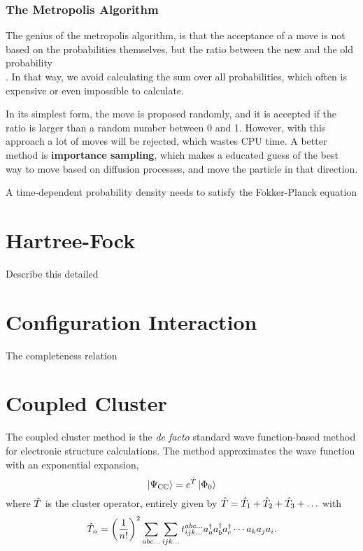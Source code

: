 \subsubsection{The Metropolis Algorithm}
The genius of the metropolis algorithm, is that the acceptance of a move is not based on the probabilities themselves, but the ratio between the new and the old probability\\
. In that way, we avoid calculating the sum over all probabilities, which often is expensive or even impossible to calculate. 

In its simplest form, the move is proposed randomly, and it is accepted if the ratio is larger than a random number between 0 and 1. However, with this approach a lot of moves will be rejected, which wastes CPU time. A better method is \textbf{importance sampling}, which makes a educated guess of the best way to move based on diffusion processes, and move the particle in that direction. 

A time-dependent probability density needs to satisfy the Fokker-Planck equation 


\section{Hartree-Fock} \label{sec:hf}
Describe this detailed


\section{Configuration Interaction} \label{subsec:ci}
The completeness relation

\section{Coupled Cluster} \label{subsec:cc}
The coupled cluster method is the \textit{de facto} standard wave function-based method for electronic structure calculations. \cite{paldus} The method approximates the wave function with an exponential expansion, 
\begin{equation}
\ket{\Psi_{\text{CC}}}=e^{\hat{T}}\ket{\Phi_0}
\end{equation}
where $\hat{T}$ is the cluster operator, entirely given by $\hat{T}=\hat{T}_1+\hat{T}_2 +\hat{T}_3+\hdots$ with
\begin{equation}
\hat{T}_n = \left( \frac{1}{n!}\right)^2 \sum_{abc...} \sum_{ijk...} t_{ijk...}^{abc...}a_a^\dagger a_b^\dagger a_c^\dagger \cdots a_k a_j a_i.
\end{equation}

